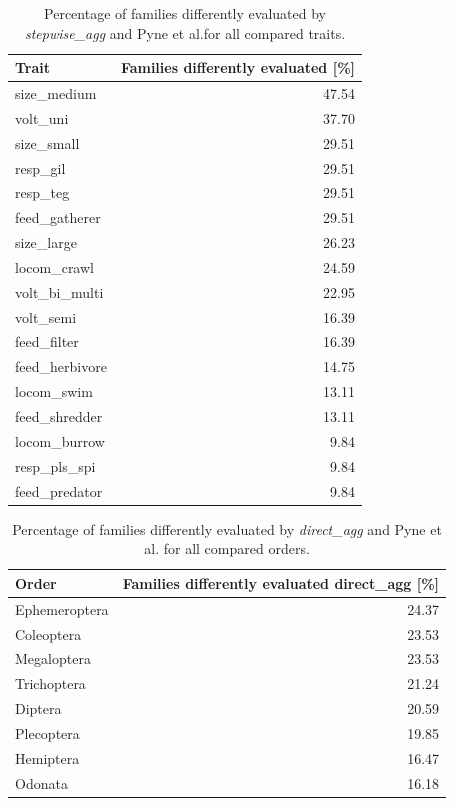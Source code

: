 \documentclass{article}
\begin{document}
\begin{table}[H]
    \centering
    \caption{Percentage of families differently evaluated by
    \textit{stepwise\_agg} and Pyne et al.for all compared traits.} 
    \label{tab:SI_perc_stepwise_agg_expert_NOA}
    \begin{tabular}{lr}
      \hline
    Trait & Families differently evaluated [\%] \\ 
      \hline
    size\_medium & 47.54 \\ 
      volt\_uni & 37.70 \\ 
      size\_small & 29.51 \\ 
      resp\_gil & 29.51 \\ 
      resp\_teg & 29.51 \\ 
      feed\_gatherer & 29.51 \\ 
      size\_large & 26.23 \\ 
      locom\_crawl & 24.59 \\ 
      volt\_bi\_multi & 22.95 \\ 
      volt\_semi & 16.39 \\ 
      feed\_filter & 16.39 \\ 
      feed\_herbivore & 14.75 \\ 
      locom\_swim & 13.11 \\ 
      feed\_shredder & 13.11 \\ 
      locom\_burrow & 9.84 \\ 
      resp\_pls\_spi & 9.84 \\ 
      feed\_predator & 9.84 \\ 
       \hline
    \end{tabular}
\end{table}

\begin{table}[H]
  \centering
  \caption{Percentage of families differently evaluated
  by \textit{direct\_agg} and Pyne et al. for all compared orders.} 
  \label{tab:SI_perc_dir_agg_expert_family_NOA}
  \begin{tabular}{lr}
  \hline
  Order & Families differently evaluated direct\_agg [\%] \\ 
  \hline
  Ephemeroptera & 24.37 \\ 
    Coleoptera & 23.53 \\ 
    Megaloptera & 23.53 \\ 
    Trichoptera & 21.24 \\ 
    Diptera & 20.59 \\ 
    Plecoptera & 19.85 \\ 
    Hemiptera & 16.47 \\ 
    Odonata & 16.18 \\ 
  \hline
  \end{tabular}
  \end{table}
\end{document}
